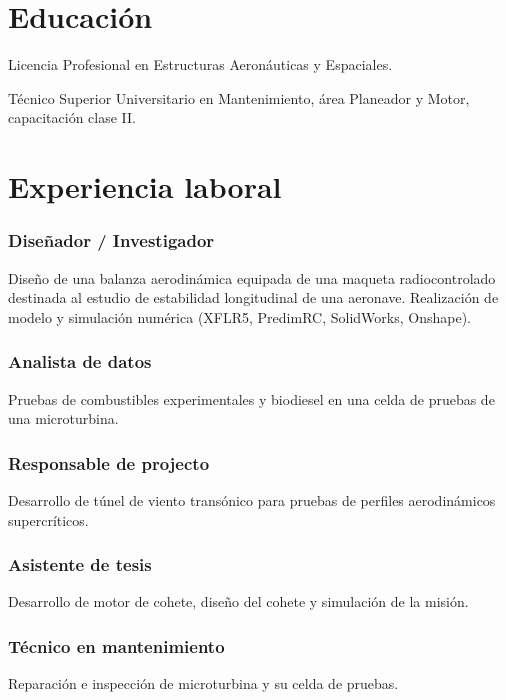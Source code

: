 \documentclass{cv}
\begin{document}

\section{Educaci\'{o}n}
Licencia Profesional en Estructuras Aeronáuticas y Espaciales.

Técnico Superior Universitario en Mantenimiento, área Planeador y Motor, capacitación clase II.

\section{Experiencia laboral}
\subsubsection{Diseñador / Investigador}
Diseño de una balanza aerodinámica equipada de una maqueta radiocontrolado destinada al estudio de estabilidad longitudinal de una aeronave. Realización de modelo y simulación numérica (XFLR5, PredimRC, SolidWorks, Onshape).

\subsubsection{Analista de datos}
Pruebas de combustibles experimentales y biodiesel en una celda de pruebas de una microturbina. 

\subsubsection{Responsable de projecto}
Desarrollo de túnel de viento transónico para pruebas de perfiles aerodinámicos supercríticos.
\subsubsection{Asistente de tesis}
Desarrollo de motor de cohete, diseño del cohete y simulación de la misión.
\subsubsection{Técnico en mantenimiento}
Reparación e inspección de microturbina y su celda de pruebas.
\end{document}
